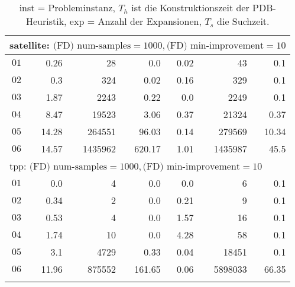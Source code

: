 \begin{longtable}{|c||r|r|r||r|r|r|}
\multicolumn{7}{|l|}{satellite: $\text{(FD) num-samples}=1000,\text{(FD) min-improvement}=10$}\\\hline
$01$ & 0.26 & 28 & 0.0 & 0.02 & 43 & 0.1 \\\hline
$02$ & 0.3 & 324 & 0.02 & 0.16 & 329 & 0.1 \\\hline
$03$ & 1.87 & 2243 & 0.22 & 0.0 & 2249 & 0.1 \\\hline
$04$ & 8.47 & 19523 & 3.06 & 0.37 & 21324 & 0.37 \\\hline
$05$ & 14.28 & 264551 & 96.03 & 0.14 & 279569 & 10.34 \\\hline
$06$ & 14.57 & 1435962 & 620.17 & 1.01 & 1435987 & 45.5 \\\hline

\multicolumn{7}{|l|}{tpp: $\text{(FD) num-samples}=1000,\text{(FD) min-improvement}=10$}\\\hline
$01$ & 0.0 & 4 & 0.0 & 0.0 & 6 & 0.1 \\\hline
$02$ & 0.34 & 2 & 0.0 & 0.21 & 9 & 0.1 \\\hline
$03$ & 0.53 & 4 & 0.0 & 1.57 & 16 & 0.1 \\\hline
$04$ & 1.74 & 10 & 0.0 & 4.28 & 58 & 0.1 \\\hline
$05$ & 3.1 & 4729 & 0.33 & 0.04 & 18451 & 0.1 \\\hline
$06$ & 11.96 & 875552 & 161.65 & 0.06 & 5898033 & 66.35 \\\hline


\caption{inst = Probleminstanz, $T_h$ ist die Konstruktionszeit der PDB-Heuristik, exp = Anzahl der Expansionen, $T_s$ die Suchzeit.}
\end{longtable}